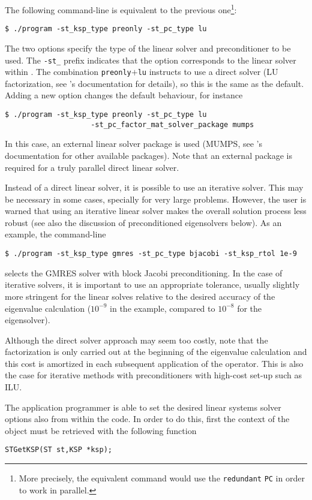 	The following command-line is equivalent to the previous one\footnote{More precisely, the equivalent command would use the \texttt{redundant} \texttt{PC} in order to work in parallel.}:
\begin{Verbatim}[fontsize=\small]
	$ ./program -st_ksp_type preonly -st_pc_type lu
\end{Verbatim}
The two options specify the type of the linear solver and preconditioner to be used. The \Verb!-st_! prefix indicates that the option corresponds to the linear solver within . The combination \texttt{preonly}$+$\texttt{lu} instructs to use a direct solver (LU factorization, see \petsc's documentation for details), so this is the same as the default. Adding a new option changes the default behaviour, for instance
\begin{Verbatim}[fontsize=\small]
	$ ./program -st_ksp_type preonly -st_pc_type lu
                    -st_pc_factor_mat_solver_package mumps
\end{Verbatim}
In this case, an external linear solver package is used (MUMPS, see \petsc's documentation for other available packages). Note that an external package is required for a truly parallel direct linear solver.

	Instead of a direct linear solver, it is possible to use an iterative solver. This may be necessary in some cases, specially for very large problems. However, the user is warned that using an iterative linear solver makes the overall solution process less robust (see also the discussion of preconditioned eigensolvers below). As an example, the command-line
\begin{Verbatim}[fontsize=\small]
	$ ./program -st_ksp_type gmres -st_pc_type bjacobi -st_ksp_rtol 1e-9
\end{Verbatim}
selects the GMRES solver with block Jacobi preconditioning. In the case of iterative solvers, it is important to use an appropriate tolerance, usually slightly more stringent for the linear solves relative to the desired accuracy of the eigenvalue calculation ($10^{-9}$ in the example, compared to $10^{-8}$ for the eigensolver). 

	Although the direct solver approach may seem too costly, note that the factorization is only carried out at the beginning of the eigenvalue calculation and this cost is amortized in each subsequent application of the operator. This is also the case for iterative methods with preconditioners with high-cost set-up such as ILU.

	The application programmer is able to set the desired linear systems solver options also from within the code. In order to do this, first the context of the  object must be retrieved with the following function
	\begin{Verbatim}[fontsize=\small]
	STGetKSP(ST st,KSP *ksp);
	\end{Verbatim}
	
